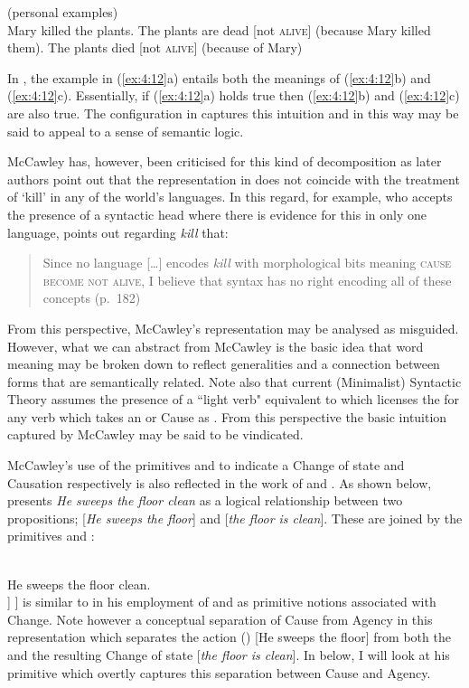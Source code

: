 \ea%
\label{ex:4:12}
(personal examples)\\
\ea Mary killed the plants.
\ex The plants are dead [not \textsc{alive}] (because Mary killed them).
\ex The plants died [\BECOME not \textsc{alive}] (because of Mary) 
\z \z

In , the example in (\ref{ex:4:12}a) entails both the meanings of (\ref{ex:4:12}b) and
(\ref{ex:4:12}c). Essentially, if (\ref{ex:4:12}a) holds true then (\ref{ex:4:12}b)
and (\ref{ex:4:12}c) are also true.  The configuration in
 captures this intuition and in this way may be said to
appeal to a sense of semantic logic.

McCawley has, however, been criticised for this kind of decomposition
as later authors point out that the representation in 
does not coincide with the treatment of ‘kill’ in any of the world’s
languages.  In this regard, \citet{Travis2000} for example, who
accepts the presence of a syntactic head where there is evidence for
this in only one language, points out regarding \textit{kill} that:

\begin{quote}
Since no language […] encodes \textit{kill} with morphological bits
meaning \textsc{cause become not alive}, I believe that syntax has no right
encoding all of these concepts (p.~182)
\end{quote}

From this perspective, McCawley’s representation may be analysed as
misguided.  However, what we can abstract from McCawley is the basic
idea that word meaning may be broken down to reflect generalities and
a connection between forms that are semantically related.  Note also
that current (Minimalist) Syntactic Theory assumes the presence of a
``light verb" equivalent to \CAUSE which licenses the 
for any verb which takes an  or Cause as .  From
this perspective the basic intuition captured by McCawley may be said
to be vindicated.

McCawley’s use of the primitives \BECOME and \CAUSE to indicate a Change
of state and Causation respectively is also reflected in the work of
\citet{Dowty1979} and \citet{Carter1976}.  As shown below,
\citet{Dowty1979} presents \textit{He sweeps the floor clean} as a
logical relationship between two propositions; [\textit{He sweeps the floor}]
and [\textit{the floor is clean}].  These are joined by the primitives
\CAUSE and \BECOME:

\ea%
\label{ex:4:13}
\citep[93]{Dowty1979}\\
He sweeps the floor clean.\\\relax
[ [He sweeps the floor] \CAUSE [\BECOME [\textit{the floor is
  clean}] ] ]
\z
\citet{Dowty1979} is similar to \citet{McCawley1968} in his
employment of \CAUSE and \BECOME as primitive notions associated with
Change.  Note however a conceptual separation of Cause from Agency in
this representation which separates the action () [He sweeps
the floor] from both the \CAUSE and the resulting Change of state
[\textit{the floor is clean}].  In  below, I will
look at his \DO primitive which overtly captures this separation
between Cause and Agency.

